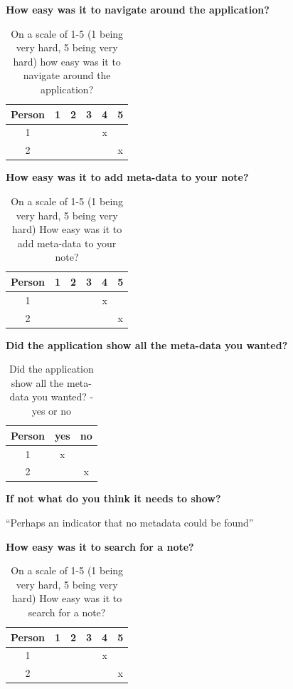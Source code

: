 \vspace{1em}
\noindent
\textbf{How easy was it to navigate around the application?}
\begin{table}[h!]
\centering
 \begin{tabular}{|c c c c c c|}
 \hline
   Person & 1 & 2 & 3 & 4 & 5 \\ [0.5ex]
 \hline\hline
    1 & & & & x &  \\
    2 & & & & & x  \\
 \hline
  \end{tabular}
  \caption{On a scale of 1-5 (1 being very hard, 5 being very hard) how easy was it to navigate around the application?}
\end{table}

\noindent
\textbf{How easy was it to add meta-data to your note?}
\begin{table}[h!]
\centering
 \begin{tabular}{|c c c c c c|}
 \hline
   Person & 1 & 2 & 3 & 4 & 5 \\ [0.5ex]
 \hline\hline
    1 & & & & x &  \\
    2 & & & & & x  \\
 \hline
  \end{tabular}
  \caption{On a scale of 1-5 (1 being very hard, 5 being very hard) How easy was it to add meta-data to your note?}
\end{table}

\noindent
\textbf{Did the application show all the meta-data you wanted?}
\begin{table}[h!]
\centering
 \begin{tabular}{|c c c|}
 \hline
   Person & yes & no \\ [0.5ex]
 \hline\hline
    1 & x &  \\
    2 & & x  \\
 \hline
  \end{tabular}
  \caption{Did the application show all the meta-data you wanted? - yes or no}
\end{table}

\noindent
\textbf{If not what do you think it needs to show?}

``Perhaps an indicator that no metadata could be found''

\noindent
\textbf{How easy was it to search for a note?}
\begin{table}[h!]
\centering
 \begin{tabular}{|c c c c c c|}
 \hline
   Person & 1 & 2 & 3 & 4 & 5 \\ [0.5ex]
 \hline\hline
    1 & & & & x &  \\
    2 & & & & & x  \\
 \hline
  \end{tabular}
  \caption{On a scale of 1-5 (1 being very hard, 5 being very hard) How easy was it to search for a note?}
\end{table}

